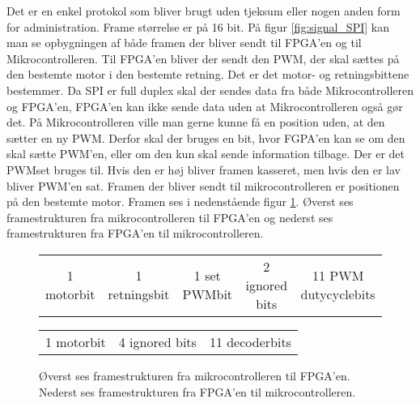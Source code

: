 Det er en enkel protokol som bliver brugt uden tjeksum eller nogen anden form for administration. Frame størrelse er på 16 bit. På figur \ref{fig:signal_SPI} kan man se opbygningen af både framen der bliver sendt til FPGA’en og til Mikrocontrolleren. Til FPGA’en bliver der sendt den PWM, der skal sættes på den bestemte motor i den bestemte retning. Det er det motor- og retningsbittene bestemmer. Da SPI er full duplex skal der sendes data fra både Mikrocontrolleren og FPGA’en, FPGA’en kan ikke sende data uden at Mikrocontrolleren også gør det. På Mikrocontrolleren ville man gerne kunne få en position uden, at den sætter en ny PWM. Derfor skal der bruges en bit, hvor FGPA’en kan se om den skal sætte PWM’en, eller om den kun skal sende information tilbage. Der er det PWMset bruges til. Hvis den er høj bliver framen kasseret, men hvis den er lav bliver PWM’en sat. Framen der bliver sendt til mikrocontrolleren er positionen på den bestemte motor. Framen ses i nedenstående figur \ref{tb:protokol1}. Øverst ses framestrukturen fra mikrocontrolleren til FPGA'en og nederst ses framestrukturen fra FPGA'en til mikrocontrolleren. 

\begin{figure}[th!]
\centering
\begin{tabular}{c|c|c|c|c}
1 motorbit &1 retningsbit & 1 set PWMbit & 2 ignored bits & 11 PWM dutycyclebits\\
\end{tabular}
 \begin{tabular}{c|c|c}
 1 motorbit & 4 ignored bits & 11 decoderbits
 \end{tabular}
\captionsetup{type=figure}
\caption[SPI framestruktur]{Øverst ses framestrukturen fra mikrocontrolleren til FPGA'en. Nederst ses framestrukturen fra FPGA'en til mikrocontrolleren.}
\label{tb:protokol1}
\end{figure}

   
  
